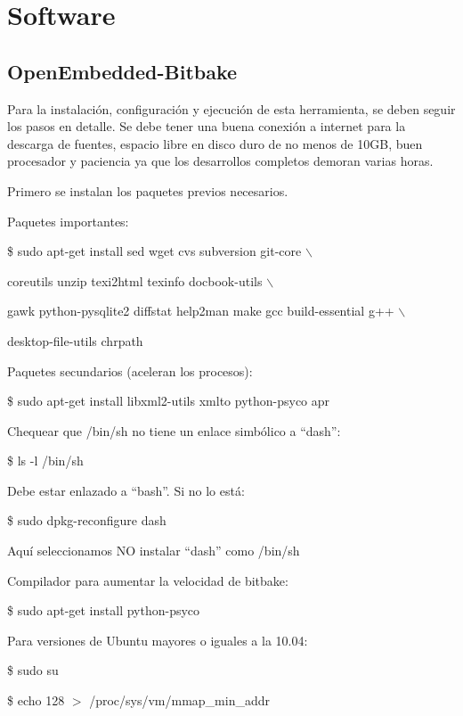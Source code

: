 \chapter{Software}

\section{OpenEmbedded-Bitbake}

Para la instalación, configuración y ejecución de esta herramienta, se deben seguir los pasos en detalle. Se debe tener una buena conexión a internet para la descarga de fuentes, espacio libre en disco duro de no menos de 10GB, buen procesador y paciencia ya que los desarrollos completos demoran varias horas.

\bigskip
Primero se instalan los paquetes previos necesarios. 

\bigskip
Paquetes importantes:

\bigskip
\centerline{\$ sudo apt-get install sed wget cvs subversion git-core $\backslash$}

\centerline{coreutils unzip texi2html texinfo docbook-utils $\backslash$}

\centerline{gawk python-pysqlite2 diffstat help2man make gcc build-essential g++ $\backslash$}

\centerline{desktop-file-utils chrpath}

\bigskip
Paquetes secundarios (aceleran los procesos):

\bigskip
\centerline{\$ sudo apt-get install libxml2-utils xmlto python-psyco apr}

\newpage
Chequear que /bin/sh no tiene un enlace simbólico a “dash”:

\bigskip
\centerline{\$ ls -l /bin/sh}

\bigskip
Debe estar enlazado a “bash”. Si no lo está:

\bigskip
\centerline{\$ sudo dpkg-reconfigure dash}

\bigskip
Aquí seleccionamos NO instalar “dash” como /bin/sh

\bigskip
Compilador para aumentar la velocidad de bitbake:

\bigskip
\centerline{\$ sudo apt-get install python-psyco}

\bigskip
Para versiones de Ubuntu mayores o iguales a la 10.04:

\bigskip
\centerline{\$ sudo su}

\centerline{\$ echo 128 $>$ /proc/sys/vm/mmap\_min\_addr}

